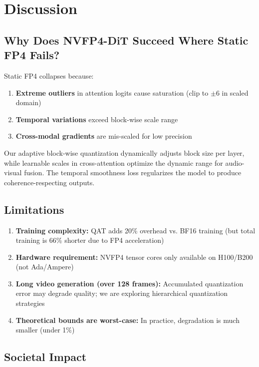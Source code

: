 \documentclass[journal]{IEEEtran}
\theoremstyle{definition}
\theoremstyle{remark}
\begin{document}
\section{Discussion}
\label{sec:discussion}

\subsection{Why Does NVFP4-DiT Succeed Where Static FP4 Fails?}

Static FP4 collapses because:
\begin{enumerate}
    \item \textbf{Extreme outliers} in attention logits cause saturation (clip to $\pm6$ in scaled domain)
    \item \textbf{Temporal variations} exceed block-wise scale range
    \item \textbf{Cross-modal gradients} are mis-scaled for low precision
\end{enumerate}

Our adaptive block-wise quantization dynamically adjusts block size per layer, while learnable scales in cross-attention optimize the dynamic range for audio-visual fusion. The temporal smoothness loss regularizes the model to produce coherence-respecting outputs.

\subsection{Limitations}

\begin{enumerate}
    \item \textbf{Training complexity:} QAT adds 20\% overhead vs. BF16 training (but total training is 66\% shorter due to FP4 acceleration)
    \item \textbf{Hardware requirement:} NVFP4 tensor cores only available on H100/B200 (not Ada/Ampere)
    \item \textbf{Long video generation (over 128 frames):} Accumulated quantization error may degrade quality; we are exploring hierarchical quantization strategies
    \item \textbf{Theoretical bounds are worst-case:} In practice, degradation is much smaller (under 1\%)
\end{enumerate}

\subsection{Societal Impact}
\end{document}
